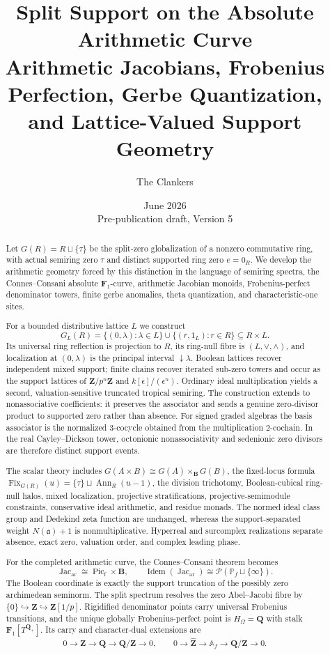 \documentclass[11pt]{amsart}
\title[Split Support on the Absolute Arithmetic Curve]
{Split Support on the Absolute Arithmetic Curve\\[4pt]
\large Arithmetic Jacobians, Frobenius Perfection, Gerbe Quantization, and Lattice-Valued Support Geometry}
\author{The Clankers}
\date{June 2026\\Pre-publication draft, Version 5}
\numberwithin{equation}{section}
\theoremstyle{definition}
\begin{document}
\begin{abstract}
Let $G(R)=R\sqcup\{\tau\}$ be the split-zero globalization of a
nonzero commutative ring, with actual semiring zero $\tau$ and distinct
supported ring zero $e=0_R$.  We develop the arithmetic geometry forced
by this distinction in the language of semiring spectra, the
Connes--Consani absolute $\mathbf F_1$-curve, arithmetic Jacobian monoids,
Frobenius-perfect denominator towers, finite gerbe anomalies, theta
quantization, and characteristic-one sites.

For a bounded distributive lattice $L$ we construct
\[
G_L(R)=\{(0,\lambda):\lambda\in L\}\cup
       \{(r,1_L):r\in R\}\subseteq R\times L.
\]
Its universal ring reflection is projection to $R$, its ring-null fibre is
$(L,\vee,\wedge)$, and localization at $(0,\lambda)$ is the principal
interval $\downarrow\lambda$.  Boolean lattices recover independent mixed
support; finite chains recover iterated sub-zero towers and occur as the
support lattices of $\mathbf Z/p^n\mathbf Z$ and
$k[\epsilon]/(\epsilon^n)$.  Ordinary ideal multiplication yields a
second, valuation-sensitive truncated tropical semiring.  The construction
extends to nonassociative coefficients: it preserves the associator and
sends a genuine zero-divisor product to supported zero rather than absence.
For signed graded algebras the basis associator is the normalized
$3$-cocycle obtained from the multiplication $2$-cochain.  In the real
Cayley--Dickson tower, octonionic nonassociativity and sedenionic zero
divisors are therefore distinct support events.

The scalar theory includes
$G(A\times B)\cong G(A)\times_{\mathbf B}G(B)$, the fixed-locus formula
$\operatorname{Fix}_{G(R)}(u)=\{\tau\}\sqcup\operatorname{Ann}_R(u-1)$,
the division trichotomy, Boolean-cubical ring-null halos, mixed
localization, projective stratifications, projective-semimodule
constraints, conservative ideal arithmetic, and residue monads.  The
normed ideal class group and Dedekind zeta function are unchanged, whereas
the support-separated weight $N(\mathfrak a)+1$ is nonmultiplicative.
Hyperreal and surcomplex realizations separate absence, exact zero,
valuation order, and complex leading phase.

For the completed arithmetic curve, the Connes--Consani theorem becomes
\[
\operatorname{Jac}_{\mathrm{ar}}
\cong\operatorname{Pic}_{\mathrm f}\times\mathbf B,
\qquad
\operatorname{Idem}(\operatorname{Jac}_{\mathrm{ar}})
\cong\mathcal P(\mathbb P_f\sqcup\{\infty\}).
\]
The Boolean coordinate is exactly the support truncation of the possibly
zero archimedean seminorm.  The split spectrum resolves the zero
Abel--Jacobi fibre by
$\{0\}\hookrightarrow\mathbf Z\hookrightarrow\mathbf Z[1/p]$.
Rigidified denominator points carry universal Frobenius transitions, and
the unique globally Frobenius-perfect point is $H_\Omega=\mathbf Q$ with
stalk $\mathbf F_1[T^{\mathbf Q_+}]$.  Its carry and character-dual
extensions are
\[
0\to\mathbf Z\to\mathbf Q\to\mathbf Q/\mathbf Z\to0,
\qquad
0\to\widehat{\mathbf Z}\to\mathbb A_f\to\mathbf Q/\mathbf Z\to0.
\]


\end{abstract}
\end{document}
